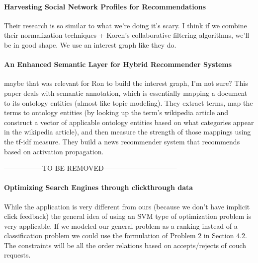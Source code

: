 
\paragraph{Harvesting Social Network Profiles for Recommendations} \cite{Liu2005}
Their research is so similar to what we're doing it's scary.
I think if we combine their normalization techniques + Koren's collaborative filtering algorithms, we'll be in good shape.
We use an interest graph like they do. 

\paragraph{An Enhanced Semantic Layer for Hybrid Recommender Systems} \cite{Cantador2011}
 maybe that was relevant for Ron to build the interest graph, I'm not sure?
This paper deals with semantic annotation, which is essentially mapping a document to its ontology entities (almost like topic modeling). They extract terms, map the terms to ontology entities (by looking up the term's wikipedia article and construct a vector of applicable ontology entities based on what categories appear in the wikipedia article), and then measure the strength of those mappings using the tf-idf measure.
They build a news recommender system that recommends based on activation propagation.


-----------------TO BE REMOVED--------------------------------

\paragraph{Optimizing Search Engines through clickthrough data} \cite{Joachims2002}
While the application is very different from ours (because we don't have implicit click feedback) the general idea of using an SVM type of optimization problem is very applicable.
If we modeled our general problem as a ranking instead of a classification problem we could use the formulation of Problem 2 in Section 4.2.
The constraints will be all the order relations based on accepts/rejects of couch requests.

